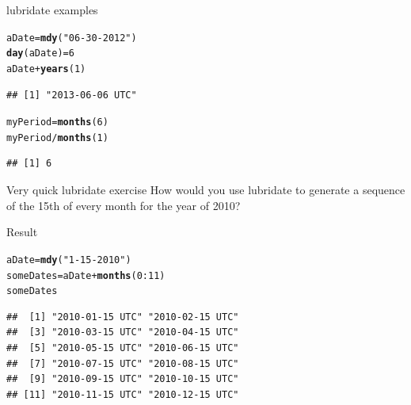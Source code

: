 \documentclass[xcolor=dvipsnames]{beamer}\usepackage{graphicx, color}
\makeatletter
\newcommand{\hlfunctioncall}[1]{\textcolor[rgb]{0.501960784313725,0,0.329411764705882}{\textbf{#1}}}%
\newcommand{\hlstring}[1]{\textcolor[rgb]{0.6,0.6,1}{#1}}%
\newenvironment{kframe}{%
 \def\at@end@of@kframe{}%
 \ifinner\ifhmode%
  \def\at@end@of@kframe{\end{minipage}}%
  \begin{minipage}{\columnwidth}%
 \fi\fi%
 \def\FrameCommand##1{\hskip\@totalleftmargin \hskip-\fboxsep
 \colorbox{shadecolor}{##1}\hskip-\fboxsep
     \hskip-\linewidth \hskip-\@totalleftmargin \hskip\columnwidth}%
 \MakeFramed {\advance\hsize-\width
   \@totalleftmargin\z@ \linewidth\hsize
   \@setminipage}}%
 {\par\unskip\endMakeFramed%
 \at@end@of@kframe}
\newenvironment{knitrout}{}{} %
\makeatother
\begin{document}
\begin{frame}[fragile]{lubridate examples}
\begin{knitrout}
\color{fgcolor}\begin{kframe}
\begin{alltt}
aDate = \hlfunctioncall{mdy}(\hlstring{"06-30-2012"})
\hlfunctioncall{day}(aDate) = 6
aDate + \hlfunctioncall{years}(1)
\end{alltt}
\begin{verbatim}
## [1] "2013-06-06 UTC"
\end{verbatim}
\begin{alltt}
myPeriod = \hlfunctioncall{months}(6)
myPeriod/\hlfunctioncall{months}(1)
\end{alltt}


{\ttfamily\noindent\itshape\color{messagecolor}{\#\# estimate only: convert to intervals for accuracy}}\begin{verbatim}
## [1] 6
\end{verbatim}
\end{kframe}
\end{knitrout}

\end{frame}

\begin{frame}[fragile]{Very quick lubridate exercise}
How would you use lubridate to generate a sequence of the 15th of every month for the year of 2010?
\end{frame}

\begin{frame}[fragile]{Result}
\begin{knitrout}
\color{fgcolor}\begin{kframe}
\begin{alltt}
aDate = \hlfunctioncall{mdy}(\hlstring{"1-15-2010"})
someDates = aDate + \hlfunctioncall{months}(0:11)
someDates
\end{alltt}
\begin{verbatim}
##  [1] "2010-01-15 UTC" "2010-02-15 UTC"
##  [3] "2010-03-15 UTC" "2010-04-15 UTC"
##  [5] "2010-05-15 UTC" "2010-06-15 UTC"
##  [7] "2010-07-15 UTC" "2010-08-15 UTC"
##  [9] "2010-09-15 UTC" "2010-10-15 UTC"
## [11] "2010-11-15 UTC" "2010-12-15 UTC"
\end{verbatim}
\end{kframe}
\end{knitrout}

\end{frame}
\end{document}
